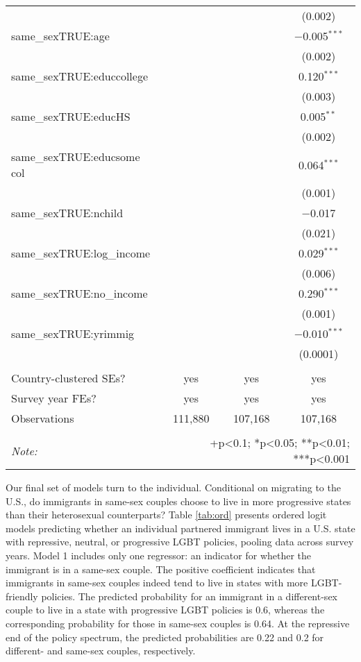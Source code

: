 \documentclass[
  11pt,
]{article}
\begin{document}
\begin{table}[!htbp]
\begin{tabular}{@{\extracolsep{5pt}}lccc}
  &  &  & (0.002) \\ 
  same\_sexTRUE:age &  &  & $-$0.005$^{***}$ \\ 
  &  &  & (0.002) \\ 
  same\_sexTRUE:educcollege &  &  & 0.120$^{***}$ \\ 
  &  &  & (0.003) \\ 
  same\_sexTRUE:educHS &  &  & 0.005$^{**}$ \\ 
  &  &  & (0.002) \\ 
  same\_sexTRUE:educsome col &  &  & 0.064$^{***}$ \\ 
  &  &  & (0.001) \\ 
  same\_sexTRUE:nchild &  &  & $-$0.017 \\ 
  &  &  & (0.021) \\ 
  same\_sexTRUE:log\_income &  &  & 0.029$^{***}$ \\ 
  &  &  & (0.006) \\ 
  same\_sexTRUE:no\_income &  &  & 0.290$^{***}$ \\ 
  &  &  & (0.001) \\ 
  same\_sexTRUE:yrimmig &  &  & $-$0.010$^{***}$ \\ 
  &  &  & (0.0001) \\ 
 \hline \\[-1.8ex] 
Country-clustered SEs? & yes & yes & yes \\ 
Survey year FEs? & yes & yes & yes \\ 
Observations & 111,880 & 107,168 & 107,168 \\ 
\hline 
\hline \\[-1.8ex] 
\textit{Note:}  & \multicolumn{3}{r}{+p<0.1; *p<0.05; **p<0.01; ***p<0.001} \\ 
\end{tabular} 
\end{table}

Our final set of models turn to the individual. Conditional on migrating to the U.S., do immigrants in same-sex couples choose to live in more progressive states than their heterosexual counterparts? Table \ref{tab:ord} presents ordered logit models predicting whether an individual partnered immigrant lives in a U.S. state with repressive, neutral, or progressive LGBT policies, pooling data across survey years. Model 1 includes only one regressor: an indicator for whether the immigrant is in a same-sex couple. The positive coefficient indicates that immigrants in same-sex couples indeed tend to live in states with more LGBT-friendly policies. The predicted probability for an immigrant in a different-sex couple to live in a state with progressive LGBT policies is 0.6, whereas the corresponding probability for those in same-sex couples is 0.64. At the repressive end of the policy spectrum, the predicted probabilities are 0.22 and 0.2 for different- and same-sex couples, respectively.
\end{document}
